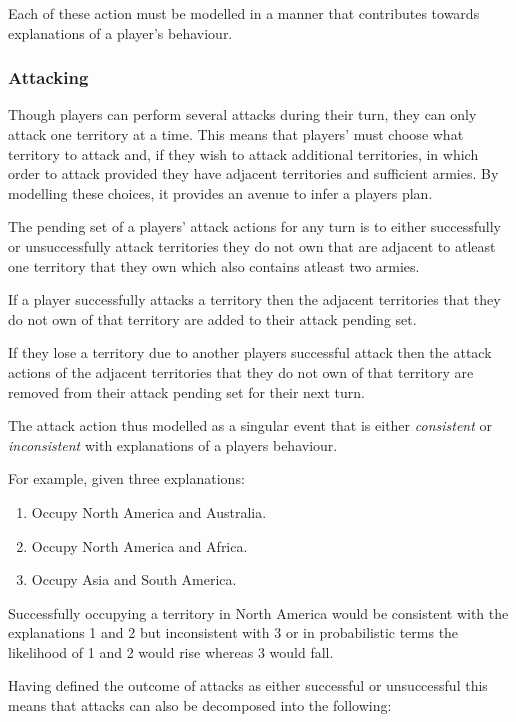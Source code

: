 \documentclass[parskip]{cs4rep}
\begin{document}
Each of these action must be modelled in a manner that contributes towards explanations of a player's behaviour.

\subsubsection{Attacking}

Though players can perform several attacks during their turn, they can only attack one territory at a time. This means that players' must choose what territory to attack and, if they wish to attack additional territories, in which order to attack provided they have adjacent territories and sufficient armies. By modelling these choices, it provides an avenue to infer a players plan.

The pending set of a players' attack actions for any turn is to either successfully or unsuccessfully attack territories they do not own that are adjacent to atleast one territory that they own which also contains atleast two armies.

If a player successfully attacks a territory then the adjacent territories that they do not own of that territory are added to their attack pending set.

If they lose a territory due to another players successful attack then the attack actions of the adjacent territories that they do not own of that territory are removed from their attack pending set for their next turn. 

The attack action thus modelled as a singular event that is either \textit{consistent} or \textit{inconsistent} with explanations of a players behaviour.

For example, given three explanations:

\begin{enumerate}
\item
Occupy North America and Australia.
\item
Occupy North America and Africa.
\item
Occupy Asia and South America.
\end{enumerate}

Successfully occupying a territory in North America would be consistent with the explanations 1 and 2 but inconsistent with 3 or in probabilistic terms the likelihood of 1 and 2 would rise whereas 3 would fall.

Having defined the outcome of attacks as either successful or unsuccessful this means that attacks can also be decomposed into the following: 
\end{document}
